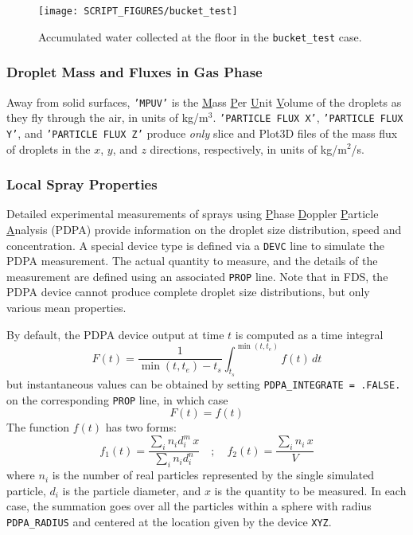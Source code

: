 \documentclass[11pt]{book}
\newcommand{\ct}{\tt\small}
\newcommand{\be}{\begin{equation}}
\newcommand{\ee}{\end{equation}}
\begin{document}
\begin{figure}[ht]
\centering
\texttt{[image: SCRIPT\_FIGURES/bucket\_test]}
\caption[Output of the {\ct bucket\_test} case.]{Accumulated water collected at the floor in the {\ct bucket\_test} case.}
\label{bucket_test_fig}
\end{figure}





\subsubsection{Droplet Mass and Fluxes in Gas Phase}

Away from solid surfaces, {\ct 'MPUV'} is the \underline{M}ass \underline{P}er \underline{U}nit \underline{V}olume of the droplets as they fly through
the air, in units of kg/m$^3$.  {\ct 'PARTICLE FLUX X'},  {\ct 'PARTICLE FLUX Y'}, and {\ct 'PARTICLE FLUX Z'} produce {\em only} slice and Plot3D files
of the mass flux of droplets in the $x$, $y$, and $z$ directions, respectively, in units of kg/m$^2$/s.

\subsubsection{Local Spray Properties}
\label{PDPA}

Detailed experimental measurements of sprays using \underline{P}hase \underline{D}oppler \underline{P}article
\underline{A}nalysis (PDPA) provide information on the droplet size distribution, speed and concentration.
A special device type is defined via a {\ct DEVC} line to simulate the PDPA measurement. The actual quantity to measure, and the details of the
measurement are defined using an associated {\ct PROP} line. Note that in FDS, the PDPA device cannot produce complete droplet size
distributions, but only various mean properties.

By default, the PDPA device output at time $t$ is computed as a time integral
\be
F(t) = \frac{1}{\min(t,t_e)-t_s} \int_{t_s}^{\min(t,t_e)} f(t) \, dt
\ee
but instantaneous values can be obtained by setting {\ct PDPA\_INTEGRATE = .FALSE.} on the corresponding {\ct PROP} line, in which case
\be
F(t) = f(t)
\ee
The function $f(t)$ has two forms:
\be
f_1(t) =  \frac{\sum_i n_i d_i^m \, x}{\sum_i n_i d_i^n}  \quad ; \quad
f_2(t) = \frac{\sum_i n_i \, x}{V}
\ee
where $n_i$ is the number of real particles represented by the single simulated particle, $d_i$
is the particle diameter, and $x$ is the quantity to be measured. In each case, the summation goes over all the particles within a sphere
with radius {\ct PDPA\_RADIUS} and centered at the location given by the device {\ct XYZ}.
\end{document}
